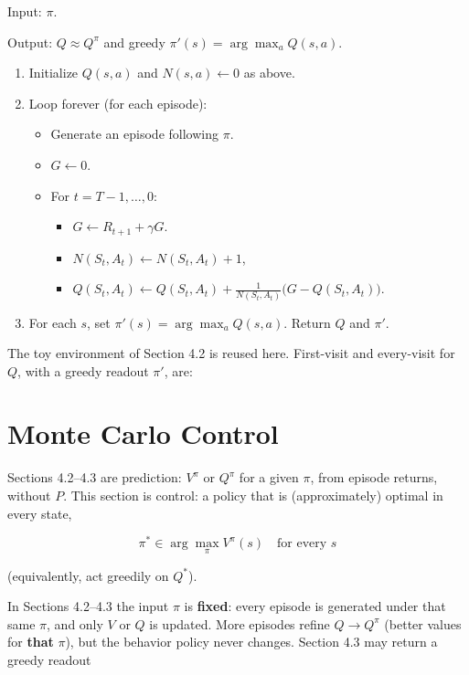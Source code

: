 \begin{implnote}
Input: $\pi$.

Output: $Q\approx Q^\pi$ and greedy $\pi'(s)=\arg\max_a Q(s,a)$.

\begin{enumerate}
\item Initialize $Q(s,a)$ and $N(s,a)\leftarrow 0$ as above.
\item Loop forever (for each episode):
\begin{itemize}
\item Generate an episode following $\pi$.
\item $G\leftarrow 0$.
\item For $t=T{-}1,\ldots,0$:
\begin{itemize}
\item $G\leftarrow R_{t+1}+\gamma G$.
\item $N(S_t,A_t)\leftarrow N(S_t,A_t)+1$,
\item $Q(S_t,A_t)\leftarrow Q(S_t,A_t)+\frac{1}{N(S_t,A_t)}\bigl(G-Q(S_t,A_t)\bigr)$.
\end{itemize}
\end{itemize}
\item For each $s$, set $\pi'(s)=\arg\max_a Q(s,a)$. Return $Q$ and $\pi'$.
\end{enumerate}

\end{implnote}

The toy environment of Section 4.2 is reused here. First-visit and every-visit for $Q$, with a greedy readout $\pi'$, are:




\section{Monte Carlo Control}

Sections 4.2--4.3 are prediction: $V^\pi$ or $Q^\pi$ for a given $\pi$, from episode returns, without $P$. This section is control: a policy that is (approximately) optimal in every state,

\[
\pi^*
\in
\arg\max_\pi V^\pi(s)
\quad\text{for every }s
\]

(equivalently, act greedily on $Q^*$).

In Sections 4.2--4.3 the input $\pi$ is \textbf{fixed}: every episode is generated under that same $\pi$, and only $V$ or $Q$ is updated. More episodes refine $Q\to Q^\pi$ (better values for \textbf{that} $\pi$), but the behavior policy never changes. Section 4.3 may return a greedy readout

